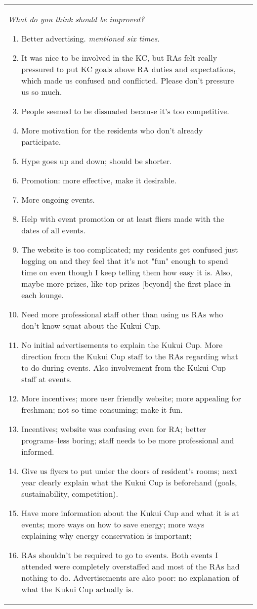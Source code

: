 \documentclass[]{IEEEconf}
\begin{document}
\begin{figure*}[th!]
\begin{tabular}{|l|l|}
\small  \begin{minipage}[t]{4.0in}
{\em What do you think should be improved?}
\begin{enumerate}
\item 	Better advertising. {\em mentioned six times}.
\item It was nice to be involved in the KC, but RAs felt really pressured to put KC goals above RA duties and expectations, which made us confused and conflicted.  Please don't pressure us so much.
\item People seemed to be dissuaded because it's too competitive.
\item More motivation for the residents who don't already participate.
\item Hype goes up and down; should be shorter.
\item Promotion: more effective, make it desirable.
\item More ongoing events.
\item Help with event promotion or at least fliers made with the dates of all events.
\item The website is too complicated; my residents get confused just logging on and they feel that it's not "fun" enough to spend time on even though I keep telling them how easy it is.  Also, maybe more prizes, like top prizes [beyond] the first place in each lounge.
\item Need more professional staff other than using us RAs who don't know squat about the Kukui Cup.
\item 	No initial advertisements to explain the Kukui Cup. More direction from the Kukui Cup staff to the RAs regarding what to do during events. Also involvement from the Kukui Cup staff at events. 
\item 	More incentives; more user friendly website; more appealing for freshman; not so time consuming; make it fun.
\item 	Incentives; website was confusing even for RA; better programs--less boring; staff needs to be more professional and informed.
\item 	Give us flyers to put under the doors of resident's rooms; next year clearly explain what the Kukui Cup is beforehand (goals, sustainability, competition).
\item 	Have more information about the Kukui Cup and what it is at events; more ways on how to save energy; more ways explaining why energy conservation is important;
\item 	RAs shouldn't be required to go to events.  Both events I attended were completely overstaffed and most of the RAs had nothing to do.   Advertisements are also poor: no explanation of what the Kukui Cup actually is.

\end{enumerate}
\end{minipage}
\end{tabular}
\end{figure*}
\end{document}

